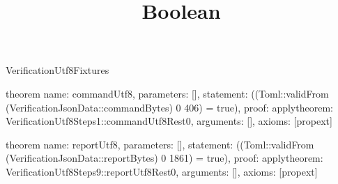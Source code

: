 \begin{lexlean}{VerificationUtf8Fixtures}
\title{Boolean}
\begin{semanticmodule}

theorem{
  name: commandUtf8,
  parameters: [],
  statement: ((Toml::validFrom (VerificationJsonData::commandBytes) 0 406) = true),
  proof: apply{theorem: VerificationUtf8Steps1::commandUtf8Rest0, arguments: []},
  axioms: [propext]
}

theorem{
  name: reportUtf8,
  parameters: [],
  statement: ((Toml::validFrom (VerificationJsonData::reportBytes) 0 1861) = true),
  proof: apply{theorem: VerificationUtf8Steps9::reportUtf8Rest0, arguments: []},
  axioms: [propext]
}

\end{semanticmodule}
\end{lexlean}
